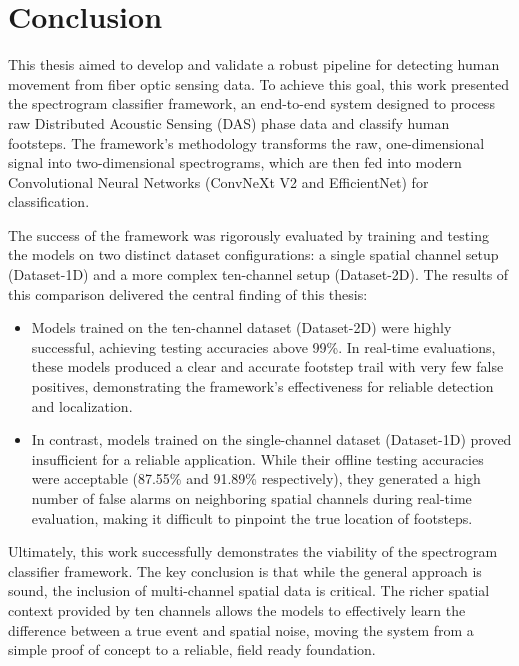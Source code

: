 \chapter{Conclusion}
\label{cha:conclusion}

This thesis aimed to develop and validate a robust pipeline for detecting human movement from fiber optic sensing data. To achieve this goal, this work presented the spectrogram classifier framework, an end-to-end system designed to process raw Distributed Acoustic Sensing (DAS) phase data and classify human footsteps. The framework's methodology transforms the raw, one-dimensional signal into two-dimensional spectrograms, which are then fed into modern Convolutional Neural Networks (ConvNeXt V2 and EfficientNet) for classification.

The success of the framework was rigorously evaluated by training and testing the models on two distinct dataset configurations: a single spatial channel setup (Dataset-1D) and a more complex ten-channel setup (Dataset-2D). The results of this comparison delivered the central finding of this thesis:

\begin{itemize}
\item Models trained on the ten-channel dataset (Dataset-2D) were highly successful, achieving testing accuracies above 99\%. In real-time evaluations, these models produced a clear and accurate footstep trail with very few false positives, demonstrating the framework's effectiveness for reliable detection and localization.

\item In contrast, models trained on the single-channel dataset (Dataset-1D) proved insufficient for a reliable application. While their offline testing accuracies were acceptable (87.55\% and 91.89\% respectively), they generated a high number of false alarms on neighboring spatial channels during real-time evaluation, making it difficult to pinpoint the true location of footsteps.
\end{itemize}

Ultimately, this work successfully demonstrates the viability of the spectrogram classifier framework. The key conclusion is that while the general approach is sound, the inclusion of multi-channel spatial data is critical. The richer spatial context provided by ten channels allows the models to effectively learn the difference between a true event and spatial noise, moving the system from a simple proof of concept to a reliable, field ready foundation.

